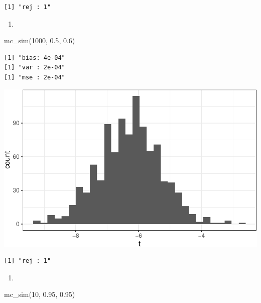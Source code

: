 \documentclass[
  letterpaper,
  DIV=11,
  numbers=noendperiod]{scrreprt}
\newenvironment{Shaded}{\begin{snugshade}}{\end{snugshade}}
\newcommand{\DecValTok}[1]{\textcolor[rgb]{0.68,0.00,0.00}{#1}}
\newcommand{\FloatTok}[1]{\textcolor[rgb]{0.68,0.00,0.00}{#1}}
\newcommand{\FunctionTok}[1]{\textcolor[rgb]{0.28,0.35,0.67}{#1}}
\newcommand{\NormalTok}[1]{\textcolor[rgb]{0.00,0.23,0.31}{#1}}
\providecommand{\tightlist}{%
  \setlength{\itemsep}{0pt}\setlength{\parskip}{0pt}}\usepackage{longtable,booktabs,array}
\begin{document}
\begin{verbatim}
[1] "rej : 1"
\end{verbatim}

\begin{enumerate}
\def\labelenumi{\arabic{enumi}.}
\setcounter{enumi}{6}
\tightlist
\item
\end{enumerate}

\begin{Shaded}
\begin{Highlighting}[]
\FunctionTok{mc\_sim}\NormalTok{(}\DecValTok{1000}\NormalTok{, }\FloatTok{0.5}\NormalTok{, }\FloatTok{0.6}\NormalTok{)}
\end{Highlighting}
\end{Shaded}

\begin{verbatim}
[1] "bias: 4e-04"
[1] "var : 2e-04"
[1] "mse : 2e-04"
\end{verbatim}

\includegraphics{03-estimators_files/figure-pdf/unnamed-chunk-15-1.pdf}

\begin{verbatim}
[1] "rej : 1"
\end{verbatim}

\begin{enumerate}
\def\labelenumi{\arabic{enumi}.}
\setcounter{enumi}{7}
\tightlist
\item
\end{enumerate}

\begin{Shaded}
\begin{Highlighting}[]
\FunctionTok{mc\_sim}\NormalTok{(}\DecValTok{10}\NormalTok{, }\FloatTok{0.95}\NormalTok{, }\FloatTok{0.95}\NormalTok{)}
\end{Highlighting}
\end{Shaded}
\end{document}
